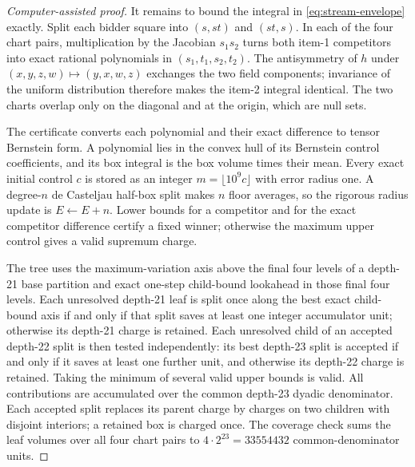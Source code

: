 \documentclass[11pt]{article}
\begin{document}
\begin{proof}[Computer-assisted proof]
It remains to bound the integral in \eqref{eq:stream-envelope} exactly.  Split
each bidder square into \((s,st)\) and \((st,s)\).  In each of the four chart
pairs, multiplication by the Jacobian \(s_1s_2\) turns both item-1 competitors
into exact rational polynomials in \((s_1,t_1,s_2,t_2)\).  The antisymmetry of
\(h\) under \((x,y,z,w)\mapsto(y,x,w,z)\) exchanges the two field components;
invariance of the uniform distribution therefore makes the item-2 integral
identical.  The two charts overlap only on the diagonal and at the origin,
which are null sets.

The certificate converts each polynomial and their exact difference to tensor
Bernstein form.  A polynomial lies in the convex hull of its Bernstein control
coefficients, and its box integral is the box volume times their mean.  Every
exact initial control \(c\) is stored as an integer \(m=\lfloor10^9c\rfloor\)
with error radius one.  A degree-\(n\) de Casteljau half-box split makes \(n\)
floor averages, so the rigorous radius update is \(E\leftarrow E+n\).  Lower
bounds for a competitor and for the exact competitor difference certify a
fixed winner; otherwise the maximum upper control gives a valid supremum
charge.

The tree uses the maximum-variation axis above the final four levels of a
depth-21 base partition and exact one-step child-bound lookahead in those final
four levels.  Each unresolved depth-21 leaf is split once along the best exact
child-bound axis if and only if that split saves at least one integer
accumulator unit; otherwise its depth-21 charge is retained.  Each unresolved
child of an accepted depth-22 split is then tested independently: its best
depth-23 split is accepted if and only if it saves at least one further unit,
and otherwise its depth-22 charge is retained.  Taking the minimum of several
valid upper bounds is valid.  All contributions are accumulated over the
common depth-23 dyadic denominator.  Each accepted split replaces its parent
charge by charges on two children with disjoint interiors; a retained box is
charged once.  The coverage check sums the leaf volumes over all four chart
pairs to \(4\cdot2^{23}=33554432\) common-denominator units.


\end{proof}
\end{document}

